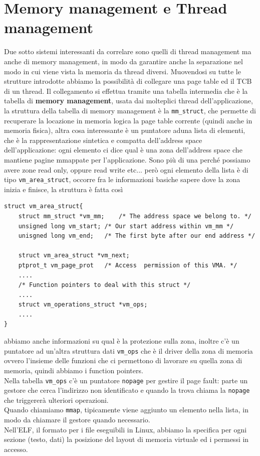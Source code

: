 \documentclass[12pt, oneside]{extbook}
\begin{document}
\section{Memory management e Thread management} 
Due sotto sistemi interessanti da correlare sono quelli di thread management ma anche di memory management, in modo da garantire anche la separazione nel modo in cui viene vista la memoria da thread diversi. Muovendosi su tutte le strutture introdotte abbiamo la possibilità di collegare una page table ed il TCB di un thread. Il collegamento si effettua tramite una tabella intermedia che è la tabella di \textbf{memory management}, usata dai molteplici thread dell'applicazione, la struttura della tabella di memory management è la \texttt{mm\_struct}, che permette di recuperare la locazione in memoria logica la page table corrente (quindi anche in memoria fisica), altra cosa interessante è un puntatore aduna lista di elementi, che è la rappresentazione sintetica e compatta dell'address space dell'applicazione: ogni elemento ci dice qual è una zona dell'address space che mantiene pagine mmappate per l'applicazione. Sono più di una perché possiamo avere zone read only, oppure read write etc... però ogni elemento della lista è di tipo \texttt{vm\_area\_struct}, occorre fra le informazioni basiche sapere dove la zona inizia e finisce, la struttura è fatta così
\begin{lstlisting}
struct vm_area_struct{
	struct mm_struct *vm_mm;	/* The address space we belong to. */
	unsigned long vm_start;	/* Our start address within vm_mm */
	unisgned long vm_end;	/* The first byte after our end address */
	
	struct vm_area_struct *vm_next;
	ptprot_t vm_page_prot	/* Access  permission of this VMA. */
	....
	/* Function pointers to deal with this struct */
	....
	struct vm_operations_struct *vm_ops;
	....
}
\end{lstlisting}
abbiamo anche informazioni su qual è la protezione sulla zona, inoltre c'è un puntatore ad un'altra struttura dati \texttt{vm\_ops} che è il driver della zona di memoria ovvero l'insieme delle funzioni che ci permettono di lavorare su quella zona di memoria, quindi abbiamo i function pointers.\\Nella tabella \texttt{vm\_ops} c'è un puntatore \texttt{nopage} per gestire il page fault: parte un gestore che cerca l'indirizzo non identificato e quando la trova chiama la \texttt{nopage} che triggererà ulteriori operazioni.\\Quando chiamiamo \texttt{mmap}, tipicamente viene aggiunto un elemento nella lista, in modo da chiamare il gestore quando necessario.\\Nell'ELF, il formato per i file eseguibili in Linux, abbiamo la specifica per ogni sezione (testo, dati) la posizione del layout di memoria virtuale ed i permessi in accesso.
\end{document}
